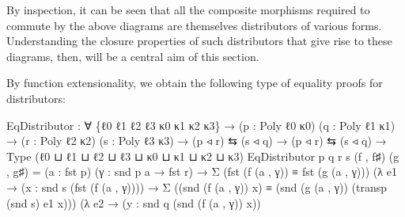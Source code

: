 \documentclass[
  11pt,
  oneside,
  article]{memoir}
\newenvironment{Shaded}{}{}
\newcommand{\NormalTok}[1]{#1}
\newcommand{\OtherTok}[1]{\textcolor[rgb]{0.00,0.44,0.13}{#1}}
\theoremstyle{definition}
\theoremstyle{plain}
\newcommand{\0}{\textsf{0}}
\newcommand{\1}{\tn{\textsf{1}}}
\begin{document}
By inspection, it can be seen that all the composite morphisms required
to commute by the above diagrams are themselves distributors of various
forms. Understanding the closure properties of such distributors that
give rise to these diagrams, then, will be a central aim of this
section.

By function extensionality, we obtain the following type of equality
proofs for distributors:

\begin{Shaded}
\begin{Highlighting}[]
\NormalTok{EqDistributor }\OtherTok{:} \OtherTok{∀} \OtherTok{\{}\NormalTok{ℓ0 ℓ1 ℓ2 ℓ3 κ0 κ1 κ2 κ3}\OtherTok{\}}
                \OtherTok{→} \OtherTok{(}\NormalTok{p }\OtherTok{:}\NormalTok{ Poly ℓ0 κ0}\OtherTok{)} \OtherTok{(}\NormalTok{q }\OtherTok{:}\NormalTok{ Poly ℓ1 κ1}\OtherTok{)}
                \OtherTok{→} \OtherTok{(}\NormalTok{r }\OtherTok{:}\NormalTok{ Poly ℓ2 κ2}\OtherTok{)} \OtherTok{(}\NormalTok{s }\OtherTok{:}\NormalTok{ Poly ℓ3 κ3}\OtherTok{)}
                \OtherTok{→} \OtherTok{(}\NormalTok{p ◃ r}\OtherTok{)}\NormalTok{ ⇆ }\OtherTok{(}\NormalTok{s ◃ q}\OtherTok{)} \OtherTok{→} \OtherTok{(}\NormalTok{p ◃ r}\OtherTok{)}\NormalTok{ ⇆ }\OtherTok{(}\NormalTok{s ◃ q}\OtherTok{)}
                \OtherTok{→}\NormalTok{ Type }\OtherTok{(}\NormalTok{ℓ0 ⊔ ℓ1 ⊔ ℓ2 ⊔ ℓ3 ⊔ κ0 ⊔ κ1 ⊔ κ2 ⊔ κ3}\OtherTok{)}
\NormalTok{EqDistributor p q r s }\OtherTok{(}\NormalTok{f , f♯}\OtherTok{)} \OtherTok{(}\NormalTok{g , g♯}\OtherTok{)} \OtherTok{=} 
    \OtherTok{(}\NormalTok{a }\OtherTok{:}\NormalTok{ fst p}\OtherTok{)} \OtherTok{(}\NormalTok{γ }\OtherTok{:}\NormalTok{ snd p a }\OtherTok{→}\NormalTok{ fst r}\OtherTok{)} 
    \OtherTok{→}\NormalTok{ Σ }\OtherTok{(}\NormalTok{fst }\OtherTok{(}\NormalTok{f }\OtherTok{(}\NormalTok{a , γ}\OtherTok{))}\NormalTok{ ≡ fst }\OtherTok{(}\NormalTok{g }\OtherTok{(}\NormalTok{a , γ}\OtherTok{)))} 
        \OtherTok{(λ}\NormalTok{ e1 }\OtherTok{→} \OtherTok{(}\NormalTok{x }\OtherTok{:}\NormalTok{ snd s }\OtherTok{(}\NormalTok{fst }\OtherTok{(}\NormalTok{f }\OtherTok{(}\NormalTok{a , γ}\OtherTok{))))}
                \OtherTok{→}\NormalTok{ Σ }\OtherTok{((}\NormalTok{snd }\OtherTok{(}\NormalTok{f }\OtherTok{(}\NormalTok{a , γ}\OtherTok{))}\NormalTok{ x}\OtherTok{)} 
\NormalTok{                    ≡ }\OtherTok{(}\NormalTok{snd }\OtherTok{(}\NormalTok{g }\OtherTok{(}\NormalTok{a , γ}\OtherTok{))} 
                           \OtherTok{(}\NormalTok{transp }\OtherTok{(}\NormalTok{snd s}\OtherTok{)}\NormalTok{ e1 x}\OtherTok{)))} 
                    \OtherTok{(λ}\NormalTok{ e2 }\OtherTok{→} \OtherTok{(}\NormalTok{y }\OtherTok{:}\NormalTok{ snd q }\OtherTok{(}\NormalTok{snd }\OtherTok{(}\NormalTok{f }\OtherTok{(}\NormalTok{a , γ}\OtherTok{))}\NormalTok{ x}\OtherTok{))} 

\end{Highlighting}
\end{Shaded}
\end{document}
